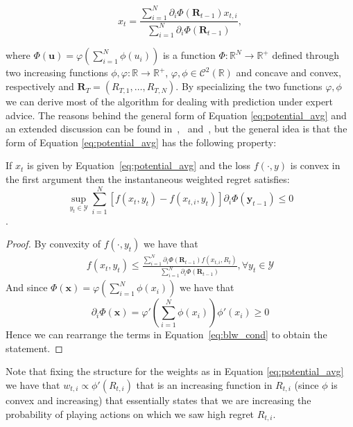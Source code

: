 \begin{equation}\label{eq:potential_avg}
x_t = \frac{\sum\limits_{i=1}^{N}\partial_i \Phi(\mathbf R_{t-1}) x_{t,i}}{\sum\limits_{i=1}^{N}\partial_i \Phi(\mathbf R_{t-1}) },
\end{equation}

where $\Phi(\mathbf u)=\varphi\left(\sum\limits_{i=1}^N\phi(u_i)\right)$ is a function $\Phi:\mathbb R^N\to\mathbb R^+$ defined through two increasing functions $\phi,\varphi:\mathbb R\to\mathbb R^+$, $\varphi,\phi\in\mathcal C^2(\mathbb R)$ and concave and convex, respectively and $\mathbf R_T=(R_{T,1},\ldots,R_{T,N})$.
By specializing the two functions $\varphi,\phi$ we can derive most of the algorithm for dealing with prediction under expert advice.
The reasons behind the general form of Equation \eqref{eq:potential_avg} and an extended discussion can be found in~\cite{hart2001general},~\cite{cesa2003potential} and~\cite{blackwell1956analog}, but the general idea is that the form of Equation \eqref{eq:potential_avg} has the following property:

\begin{theorem}
	If $x_t$ is given by Equation~\eqref{eq:potential_avg} and the loss $f(\cdot,y)$ is convex in the first argument then the instantaneous weighted regret satisfies:  
	$$\sup\limits_{y_t\in\mathcal Y}\sum\limits_{i=1}^N[f(x_t,y_t)-f(x_{t,i},y_t)]\partial_i \Phi(\mathbf y_{t-1}) \le 0$$.
\end{theorem}

\begin{proof}
	By convexity of $f(\cdot,y_t)$ we have that 
\begin{align}
	f(x_t,y_t)\le\frac{\sum\limits_{i=1}^N\partial_i\Phi(\mathbf R_{t-1})f(x_{t,i},R_t)}{\sum\limits_{i=1}^N\partial_i\Phi(\mathbf R_{t-1})}, \forall y_t\in\mathcal Y\label{eq:blw_cond}
\end{align}
And since $\Phi(\mathbf x)=\varphi\left(\sum\limits_{i=1}^N \phi(x_i)\right)$ we have that $$\partial_i\Phi(\mathbf x)=\varphi'\left(\sum\limits_{i=1}^N\phi(x_i)\right)\phi'(x_i)\ge0$$
Hence we can rearrange the terms in Equation~\eqref{eq:blw_cond} to obtain the statement.
\end{proof}

Note that fixing the structure for the weights as in Equation \eqref{eq:potential_avg} we have that $w_{t,i}\propto\phi'(R_{t,i})$ that is an increasing function in $R_{t,i}$ (since $\phi$ is convex and increasing) that essentially states that we are increasing the probability of playing actions on which we saw high regret $R_{t,i}$.

